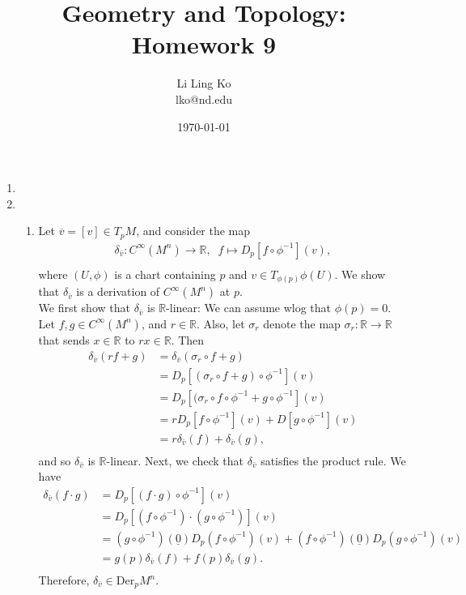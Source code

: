 \documentclass{article}
\begin{document}
\title{Geometry and Topology: Homework 9}
\author{Li Ling Ko\\ lko@nd.edu}
\date{\today}
\maketitle

\begin{enumerate}[label={\bf Q\arabic*:}]
  \item
  \item
    \begin{enumerate}
      \item Let $\overline{v}=[v]\in T_pM$, and consider the map
        \begin{align*}
          \delta_{\bar{v}}:C^\infty(M^n)\rightarrow\mathbb{R},\;\; f\mapsto
          D_p[f\circ\phi^{-1}](v), \\
        \end{align*}
        where $(U,\phi)$ is a chart containing $p$ and $v\in
        T_{\phi(p)}\phi(U)$. We show that $\delta_{\bar{v}}$ is a
        derivation of $C^\infty(M^n)$ at $p$. \\

        We first show that $\delta_{\bar{v}}$ is $\mathbb{R}$-linear: We
        can assume wlog that $\phi(p)=0$. Let $f,g\in C^\infty(M^n)$, and
        $r\in\mathbb{R}$. Also, let $\sigma_r$ denote the map
        $\sigma_r:\mathbb{R}\rightarrow\mathbb{R}$ that sends
        $x\in\mathbb{R}$ to $rx\in\mathbb{R}$. Then
        \begin{align*}
          \delta_{\bar{v}}(rf+g)  &=\delta_{\bar{v}}(\sigma_r\circ f+g) \\
            &=D_p[(\sigma_r\circ f+g)\circ\phi^{-1}](v) \\
            &=D_p[(\sigma_r\circ f\circ\phi^{-1} +g\circ\phi^{-1}](v) \\
            &=rD_p[f\circ\phi^{-1}](v) +D[g\circ\phi^{-1}](v) \\
            &=r\delta_{\bar{v}}(f) +\delta_{\bar{v}}(g), \\
        \end{align*}
        and so $\delta_{\bar{v}}$ is $\mathbb{R}$-linear. Next, we check
        that $\delta_{\bar{v}}$ satisfies the product rule. We have
        \begin{align*}
          \delta_{\bar{v}}(f\cdot g) &=D_p[(f\cdot g)\circ\phi^{-1}](v) \\
            &=D_p[(f\circ\phi^{-1})\cdot(g\circ\phi^{-1})](v) \\
            &=(g\circ\phi^{-1})(\underline{0})D_p(f\circ\phi^{-1})(v)+
              (f\circ\phi^{-1})(\underline{0})D_p(g\circ\phi^{-1})(v) \\
            &=g(p)\delta_{\bar{v}}(f) +f(p)\delta_{\bar{v}}(g). \\
        \end{align*}
        Therefore, $\delta_{\bar{v}}\in\text{Der}_pM^n$.
    \end{enumerate}
\end{enumerate}
\end{document}
